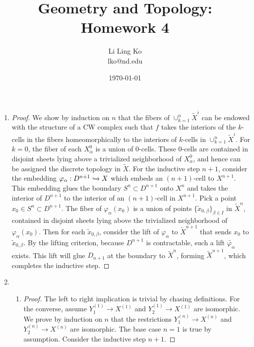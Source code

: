 \documentclass{article}
\begin{document}
\title{Geometry and Topology: Homework 4}
\author{Li Ling Ko\\ lko@nd.edu}
\date{\today}
\maketitle

\begin{enumerate}
  \item \begin{proof} We show by induction on $n$ that the fibers of
    $\cup_{k=1}^n\widetilde{X}^{i}$ can be endowed with the structure of a
    CW complex such that $f$ takes the interiors of the $k$-cells in the
    fibers homeomorphically to the interiors of $k$-cells in
    $\cup_{k=1}^n\widetilde{X}^{i}$. For $k=0$, the fiber of each
    $X^0_{\alpha}$ is a union of $0$-cells. These 0-cells are contained in
    disjoint sheets lying above a trivialized neighborhood of
    $X^0_{\alpha}$, and hence can be assigned the discrete topology in
    $\widetilde{X}$. For the inductive step $n+1$, consider the embedding
    $\varphi_\alpha:D^{n+1}\xhookrightarrow{}X$ which embeds an
    $(n+1)$-cell to $X^{n+1}$. This embedding glues the boundary
    $S^n\subset D^{n+1}$ onto $X^n$ and takes the interior of $D^{n+1}$ to
    the interior of an $(n+1)$-cell in $X^{n+1}$. Pick a point $x_0\in
    S^n\subset D^{n+1}$. The fiber of $\varphi_\alpha(x_0)$ is a union of
    points $\{\widetilde{x}_{0,\beta}\}_{\beta\in I}$ in $\widetilde{X}^n$,
    contained in disjoint sheets lying above the trivialized neighborhood
    of $\varphi_\alpha(x_0)$. Then for each $\widetilde{x}_{0,\beta}$,
    consider the lift of $\varphi_\alpha$ to $\widetilde{X}^{n+1}$ that
    sends $x_0$ to $\widetilde{x}_{0,\beta}$. By the lifting criterion,
    because $D^{n+1}$ is contractable, such a lift
    $\widetilde{\varphi_\alpha}$ exists. This lift will glue $D_{n+1}$ at
    the boundary to $\widetilde{X}^n$, forming $\widetilde{X}^{n+1}$, which
    completes the inductive step.
  \end{proof}

  \item
    \begin{enumerate}
      \item \begin{proof}
        The left to right implication is trivial by chasing definitions.
        For the converse, assume $Y_1^{(1)}\rightarrow X^{(1)}$ and
        $Y_2^{(1)}\rightarrow X^{(1)}$ are isomorphic. We prove by
        induction on $n$ that the restrictions $Y_1^{(n)}\rightarrow
        X^{(n)}$ and $Y_2^{(n)}\rightarrow X^{(n)}$ are isomorphic. The
        base case $n=1$ is true by assumption. Consider the inductive step
        $n+1$.
      \end{proof}
    \end{enumerate}
\end{enumerate}
\end{document}
